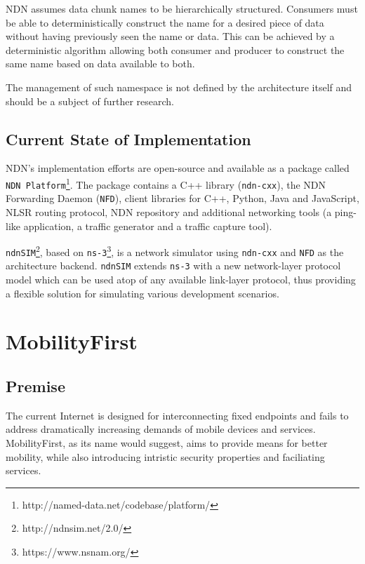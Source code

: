                 NDN assumes data chunk names to be hierarchically structured. Consumers must be able to deterministically construct the name for a desired piece of data without having previously seen the name or data. This can be achieved by a deterministic algorithm allowing both consumer and producer to construct the same name based on data available to both.

                The management of such namespace is not defined by the architecture itself and should be a subject of further research.

        \subsection{Current State of Implementation}

            NDN's implementation efforts are open-source and available as a package called \texttt{NDN Platform}\footnote{http://named-data.net/codebase/platform/}. The package contains a C++ library (\texttt{ndn-cxx}), the NDN Forwarding Daemon (\texttt{NFD}), client libraries for C++, Python, Java and JavaScript, NLSR routing protocol, NDN repository and additional networking tools (a ping-like application, a traffic generator and a traffic capture tool).

            \texttt{ndnSIM}\footnote{http://ndnsim.net/2.0/}, based on \texttt{ns-3}\footnote{https://www.nsnam.org/}, is a network simulator using \texttt{ndn-cxx} and \texttt{NFD} as the architecture backend. \texttt{ndnSIM} extends \texttt{ns-3} with a new network-layer protocol model which can be used atop of any available link-layer protocol, thus providing a flexible solution for simulating various development scenarios.


    \section{MobilityFirst}\label{archs:mf}

        \subsection{Premise}

            The current Internet is designed for interconnecting fixed endpoints and fails to address dramatically increasing demands of mobile devices and services. MobilityFirst, as its name would suggest, aims to provide means for better mobility, while also introducing intristic security properties and faciliating services.


